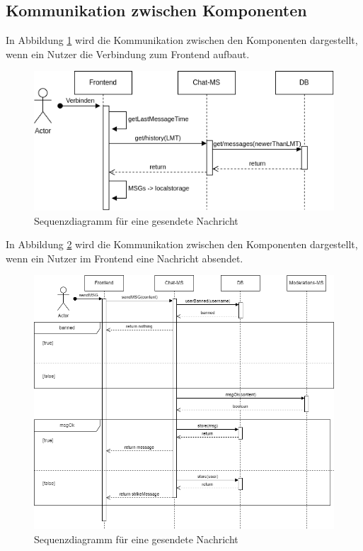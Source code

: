 \documentclass[12pt]{report}
\begin{document}
\subsection{Kommunikation zwischen Komponenten}
In Abbildung \ref{fig:seq_start} wird die Kommunikation zwischen den Komponenten dargestellt, wenn ein Nutzer die Verbindung zum Frontend aufbaut.
\begin{figure}[htbp]
	\centering
	\includegraphics[width=\linewidth]{sequence_start}
	\caption{Sequenzdiagramm für eine gesendete Nachricht}
	\label{fig:seq_start}
\end{figure}

In Abbildung \ref{fig:seq_msg} wird die Kommunikation zwischen den Komponenten dargestellt, wenn ein Nutzer im Frontend eine Nachricht absendet.
\begin{figure}[htbp]
	\centering
	\includegraphics[width=\linewidth]{sequence_msg}
	\caption{Sequenzdiagramm für eine gesendete Nachricht}
	\label{fig:seq_msg}
\end{figure}
\end{document}
